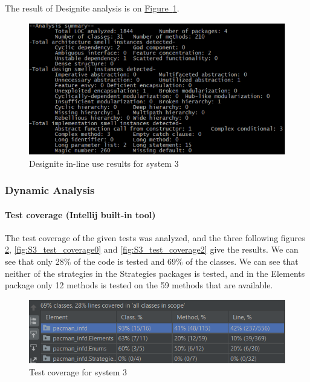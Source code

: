 \documentclass[]{article}
\newcommand{\wordlink}[2]{\hyperref[#2]{#1~\ref{#2}}}
\begin{document}
 The result of Designite analysis is on \wordlink{Figure}{fig:S3_designite}. 

\begin{figure}[h]
\centering
\includegraphics[width=0.85\linewidth]{S3-designite.png}
\caption{Designite in-line use results for system 3}
\label{fig:S3_designite}
\end{figure}


\newpage


\subsubsection{Dynamic Analysis}

\paragraph{Test coverage (Intellij built-in tool)}

The test coverage of the given tests was analyzed, and the three following figures \ref{fig:S3_test_coverage}, \ref{fig:S3_test_coverage0} and \ref{fig:S3_test_coverage2} give the results. We can see that only 28\% of the code is tested and 69\% of the classes. We can see that neither of the strategies in the Strategies packages is tested, and in the Elements package only 12 methods is tested on the 59 methods that are available.


\begin{figure}[h!]
\centering
\includegraphics[width=0.75\linewidth]{testCov.png}
\caption{Test coverage for system 3}
\label{fig:S3_test_coverage}
\end{figure}
\end{document}
